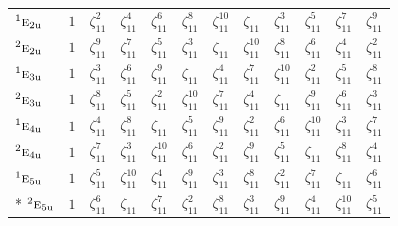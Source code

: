 \documentclass[10pt,a4paper]{article}
\numberwithin{equation}{section}
\newcommand{\irr}[1]{\text{\normalfont\scshape #1}}
\newcommand{\conjpair}[1]{{}^{#1}}
\newcommand{\ptag}[1]{\mathrm{#1}}
\newcommand{\rootunity}[1]{\zeta_{#1}}
\begin{document}
{\begin{longtable}{@{}lccccccccccc@{}}
$\conjpair{1}\irr{e}_{2\ptag{u}}$ & $1$ & $\rootunity{11}^{2}$ & $\rootunity{11}^{4}$ & $\rootunity{11}^{6}$ & $\rootunity{11}^{8}$ & $\rootunity{11}^{10}$ & $\rootunity{11}$ & $\rootunity{11}^{3}$ & $\rootunity{11}^{5}$ & $\rootunity{11}^{7}$ & $\rootunity{11}^{9}$\\
$\conjpair{2}\irr{e}_{2\ptag{u}}$ & $1$ & $\rootunity{11}^{9}$ & $\rootunity{11}^{7}$ & $\rootunity{11}^{5}$ & $\rootunity{11}^{3}$ & $\rootunity{11}$ & $\rootunity{11}^{10}$ & $\rootunity{11}^{8}$ & $\rootunity{11}^{6}$ & $\rootunity{11}^{4}$ & $\rootunity{11}^{2}$\\
$\conjpair{1}\irr{e}_{3\ptag{u}}$ & $1$ & $\rootunity{11}^{3}$ & $\rootunity{11}^{6}$ & $\rootunity{11}^{9}$ & $\rootunity{11}$ & $\rootunity{11}^{4}$ & $\rootunity{11}^{7}$ & $\rootunity{11}^{10}$ & $\rootunity{11}^{2}$ & $\rootunity{11}^{5}$ & $\rootunity{11}^{8}$\\
$\conjpair{2}\irr{e}_{3\ptag{u}}$ & $1$ & $\rootunity{11}^{8}$ & $\rootunity{11}^{5}$ & $\rootunity{11}^{2}$ & $\rootunity{11}^{10}$ & $\rootunity{11}^{7}$ & $\rootunity{11}^{4}$ & $\rootunity{11}$ & $\rootunity{11}^{9}$ & $\rootunity{11}^{6}$ & $\rootunity{11}^{3}$\\
$\conjpair{1}\irr{e}_{4\ptag{u}}$ & $1$ & $\rootunity{11}^{4}$ & $\rootunity{11}^{8}$ & $\rootunity{11}$ & $\rootunity{11}^{5}$ & $\rootunity{11}^{9}$ & $\rootunity{11}^{2}$ & $\rootunity{11}^{6}$ & $\rootunity{11}^{10}$ & $\rootunity{11}^{3}$ & $\rootunity{11}^{7}$\\
$\conjpair{2}\irr{e}_{4\ptag{u}}$ & $1$ & $\rootunity{11}^{7}$ & $\rootunity{11}^{3}$ & $\rootunity{11}^{10}$ & $\rootunity{11}^{6}$ & $\rootunity{11}^{2}$ & $\rootunity{11}^{9}$ & $\rootunity{11}^{5}$ & $\rootunity{11}$ & $\rootunity{11}^{8}$ & $\rootunity{11}^{4}$\\
$\conjpair{1}\irr{e}_{5\ptag{u}}$ & $1$ & $\rootunity{11}^{5}$ & $\rootunity{11}^{10}$ & $\rootunity{11}^{4}$ & $\rootunity{11}^{9}$ & $\rootunity{11}^{3}$ & $\rootunity{11}^{8}$ & $\rootunity{11}^{2}$ & $\rootunity{11}^{7}$ & $\rootunity{11}$ & $\rootunity{11}^{6}$\\*
$\conjpair{2}\irr{e}_{5\ptag{u}}$ & $1$ & $\rootunity{11}^{6}$ & $\rootunity{11}$ & $\rootunity{11}^{7}$ & $\rootunity{11}^{2}$ & $\rootunity{11}^{8}$ & $\rootunity{11}^{3}$ & $\rootunity{11}^{9}$ & $\rootunity{11}^{4}$ & $\rootunity{11}^{10}$ & $\rootunity{11}^{5}$\\
\bottomrule\end{longtable}}
\end{document}
